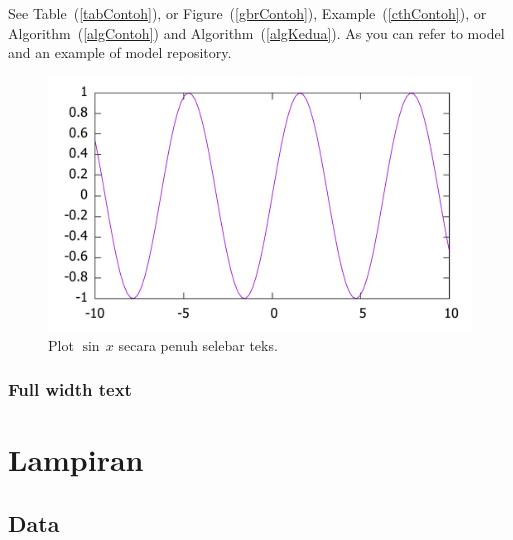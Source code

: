 \documentclass[12pt,justified,a4paper,twoside,symmetric,titlepage]{tufte-book}
\begin{document}
\lipsum[2]

See Table~(\ref{tabContoh}), or Figure~(\ref{gbrContoh}), Example~(\ref{cthContoh}), or Algorithm~(\ref{algContoh}) and  Algorithm~(\ref{algKedua}). As you can refer to model\cite{stepien2002} and an example of model repository\cite{siess2000}.

\begin{figure}
\label{gbrPenuh}
\begin{center}
\includegraphics[width=\textwidth]{plotsinus.pdf}
\end{center}
\caption{Plot $\sin\,x$ secara penuh selebar teks.}
\end{figure}

\lipsum[1-6]

\section{Full width text}

\begin{fullwidth}
\lipsum[1-2]
\end{fullwidth}
\newpage
\lipsum[3]

\appendix

\part{Lampiran}
\chapter{Data}
\lipsum



\end{document}
